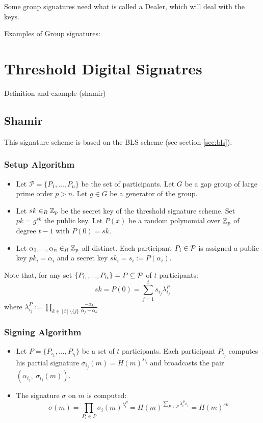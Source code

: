Some group signatures need what is called a Dealer, which will deal with the keys.

Examples of Group signatures:

\section{Threshold Digital Signatres}
Definition and example (shamir)

\subsection{Shamir}
\label{sec:shamir_sig}

This signature scheme is based on the BLS scheme (see section \ref{sec:bls}).

\subsubsection*{Setup Algorithm}

\begin{itemize}[align = left, leftmargin=*, label={--}]
\item Let $\mathcal{P}= \{ P_1, \dots , P_n \}$ be the set of participants. Let $G$ be a gap group of large prime order $p > n$. Let $g \in G$ be a generator of the group.

\item Let $sk \in_R {\mathbb Z}_p$ be the secret key of the threshold signature scheme. Set $pk = g^{sk}$ the public key. Let $P(x)$ be a random polynomial over ${\mathbb Z}_p$ of degree $t-1$ with $P(0) = sk$.

\item Let $\alpha_1, ..., \alpha_n \in_R {\mathbb Z}_p$ all distinct. Each participant $P_i \in {\mathcal P}$ is assigned a public key $pk_i = \alpha_i$ and a secret key $sk_i = s_i := P(\alpha_i)$.

\end{itemize}

Note that, for any set $\{P_{i_1}, ... , P_{i_t} \} = P \subseteq {\mathcal P}$ of $t$ participants: $$sk = P(0) = \sum_{j = 1}^t s_{i_j} \lambda_{i_j}^P$$ where $\lambda_{i_j}^P := \prod_{k \in [t] \setminus \{j\}} \frac{-\alpha_k}{\alpha_j - \alpha_k}$

\subsubsection*{Signing Algorithm}
\begin{itemize}[align = left, leftmargin=*, label={--}]

\item Let $P = \{P_{i_1}, ..., P_{i_t} \}$ be a set of $t$ participants. Each participant $P_{i_j}$ computes his partial signature $\sigma_{i_j} (m) = H(m)^{s_{i_j}}$ and broadcasts the pair $(\alpha_{i_j}, \ \sigma_{i_j} (m))$.

\item The signature $\sigma$ on $m$ is computed: $$ \sigma (m) = \prod_{P_i \in P} \sigma_i (m)^{\lambda_i^{P}}= H(m)^{\sum_{P_i \in P} \lambda_i^P s_i} = H(m)^{sk}$$
\end{itemize}

